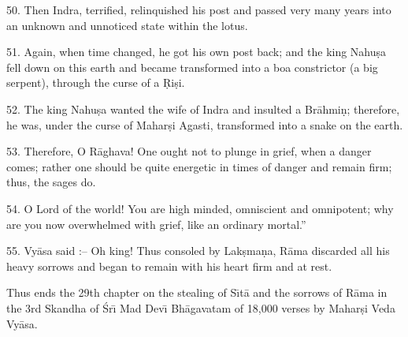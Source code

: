 50. Then Indra, terrified, relinquished his post and passed very many years into an unknown and unnoticed state within the lotus.

51. Again, when time changed, he got his own post back; and the king Nahu\d{s}a fell down on this earth and became transformed into a boa constrictor (a big serpent), through the curse of a \d{R}i\d{s}i.

52. The king Nahu\d{s}a wanted the wife of Indra and insulted a Br\=ahmi\d{n}; therefore, he was, under the curse of Mahar\d{s}i Agasti, transformed into a snake on the earth.

53. Therefore, O R\=aghava! One ought not to plunge in grief, when a danger comes; rather one should be quite energetic in times of danger and remain firm; thus, the sages do.

54. O Lord of the world! You are high minded, omniscient and omnipotent; why are you now overwhelmed with grief, like an ordinary mortal.''

55. Vy\=asa said :-- Oh king! Thus consoled by Lak\d{s}ma\d{n}a, R\=ama discarded all his heavy sorrows and began to remain with his heart firm and at rest.

Thus ends the 29th chapter on the stealing of S\={\i}t\=a and the sorrows of R\=ama in the 3rd Skandha of \'Sr\={\i} Mad Dev\={\i} Bh\=agavatam of 18,000 verses by Mahar\d{s}i Veda Vy\=asa.



